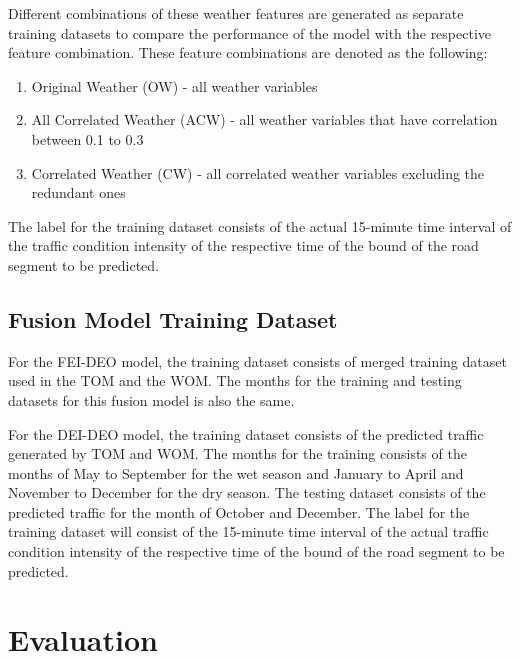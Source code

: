 Different combinations of these weather features are generated as separate training datasets to compare the performance of the model with the respective feature combination. These feature combinations are denoted as the following: 
\begin{enumerate}
\item Original Weather (OW) - all weather variables
\item All Correlated Weather (ACW) - all weather variables that have correlation between 0.1 to 0.3
\item Correlated Weather (CW) - all correlated weather variables excluding the redundant ones
\end{enumerate}

The label for the training dataset consists of the actual 15-minute time interval of the traffic condition intensity of the respective time of the bound of the road segment to be predicted.

\subsection{Fusion Model Training Dataset}
For the FEI-DEO model, the training dataset consists of merged training dataset used in the TOM and the WOM. The months for the training and testing datasets for this fusion model is also the same.

For the DEI-DEO model, the training dataset consists of the predicted traffic generated by TOM and WOM. The months for the training consists of the months of May to September for the wet season and January to April and November to December for the dry season. The testing dataset consists of the predicted traffic for the month of October and December. The label for the training dataset will consist of the 15-minute time interval of the actual traffic condition intensity of the respective time of the bound of the road segment to be predicted.

\section{Evaluation}

